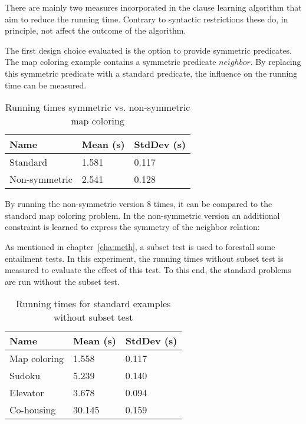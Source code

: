 There are mainly two measures incorporated in the clause learning algorithm that aim to reduce the running time.
Contrary to syntactic restrictions these do, in principle, not affect the outcome of the algorithm.

\begin{experiment}
	The first design choice evaluated is the option to provide symmetric predicates.
	The map coloring example contains a symmetric predicate $\mathit{neighbor}$.
	By replacing this symmetric predicate with a standard predicate, the influence on the running time can be measured.

	\begin{table}[!htp]
		\begin{tabularx}{\textwidth}{XXX}
			\textbf{Name}	& \textbf{Mean (s)}	& \textbf{StdDev (s)} \\
			\toprule
			Standard & 1.581 & 0.117 \\
			Non-symmetric & 2.541 & 0.128 \\
		\end{tabularx}
		\label{tbl:exp_speed_symm}
		\caption{Running times symmetric vs. non-symmetric map coloring}
	\end{table}

	By running the non-symmetric version $8$ times, it can be compared to the standard map coloring problem.
	In the non-symmetric version an additional constraint is learned to express the symmetry of the neighbor relation: 
\end{experiment}

\begin{experiment}
	As mentioned in chapter~\ref{cha:meth}, a subset test is used to forestall some entailment tests.
	In this experiment, the running times without subset test is measured to evaluate the effect of this test.
	To this end, the standard problems are run without the subset test.

	\begin{table}[!htp]
		\begin{tabularx}{\textwidth}{XXX}
			\textbf{Name}	& \textbf{Mean (s)}	& \textbf{StdDev (s)} \\
			\toprule
			Map coloring 	& 1.558				& 0.117 \\
			Sudoku 			& 5.239				& 0.140 \\
			Elevator 		& 3.678 			& 0.094 \\
			Co-housing 		& 30.145			& 0.159
		\end{tabularx}
		\label{tbl:exp_speed_standard}
		\caption{Running times for standard examples without subset test}
	\end{table}
\end{experiment}

